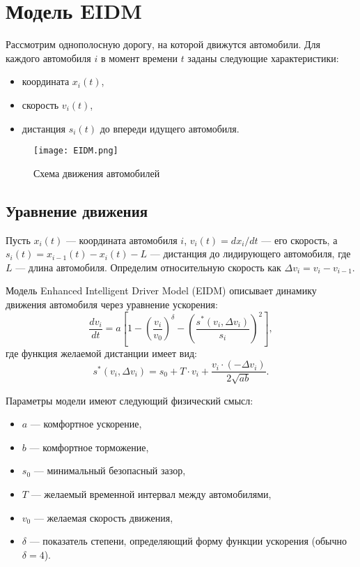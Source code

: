 \section{Модель EIDM}
\label{sec:eidm_model}

Рассмотрим однополосную дорогу, на которой движутся автомобили. Для каждого автомобиля $i$ в момент времени $t$ заданы следующие характеристики:
\begin{itemize}
    \item координата $x_i(t)$,
    \item скорость $v_i(t)$,
    \item дистанция $s_i(t)$ до впереди идущего автомобиля.
\end{itemize}
\begin{figure}[h]
	\centering
	\texttt{[image: EIDM.png]}
	\caption{Схема движения автомобилей}
	\label{fig:EIDM}
\end{figure}

\subsection{Уравнение движения}
\label{subsec:eidm_equation}

Пусть $x_i(t)$ — координата автомобиля $i$, $v_i(t)=dx_i/dt$ — его скорость, а $s_i(t)= x_{i-1}(t)- x_i(t)- L$ — дистанция до лидирующего автомобиля, где $L$ — длина автомобиля. Определим относительную скорость как $\Delta v_i= v_i- v_{i-1}$.

Модель Enhanced Intelligent Driver Model (EIDM) \cite{treiber2013,kesting2010} описывает динамику движения автомобиля через уравнение ускорения:
\begin{equation}
\label{eq:eidm}
\frac{dv_i}{dt} = a \left[1 - \left(\frac{v_i}{v_0}\right)^\delta - \left( \frac{s^*(v_i, \Delta v_i)}{s_i} \right)^2 \right],
\end{equation}
где функция желаемой дистанции имеет вид:
\begin{equation}
\label{eq:s_star}
s^*(v_i, \Delta v_i)= s_0 + T \cdot v_i + \frac{v_i \cdot (-\Delta v_i)}{2 \sqrt{a b}}.
\end{equation}

Параметры модели имеют следующий физический смысл:
\begin{itemize}
    \item $a$ — комфортное ускорение,
    \item $b$ — комфортное торможение,
    \item $s_0$ — минимальный безопасный зазор,
    \item $T$ — желаемый временной интервал между автомобилями,
    \item $v_0$ — желаемая скорость движения,
    \item $\delta$ — показатель степени, определяющий форму функции ускорения (обычно $\delta=4$).
\end{itemize}

